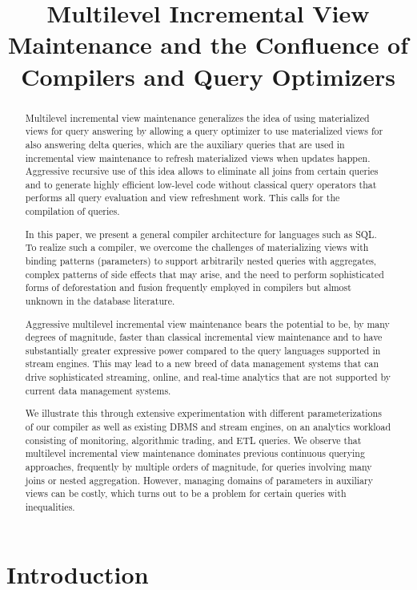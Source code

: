 \documentclass{sig-alternate}
\title{Multilevel Incremental View Maintenance and the Confluence of
Compilers and Query Optimizers}
\author{
}
\begin{document}
\maketitle


\begin{abstract}
Multilevel incremental view maintenance generalizes the idea of using materialized views for query answering by allowing a query optimizer to use materialized views for also answering delta queries, which are the auxiliary queries that are used in incremental view maintenance to refresh materialized views when updates happen. Aggressive recursive use of this idea allows to eliminate all joins from certain queries and to generate highly efficient low-level code without classical query operators that performs all query evaluation and view refreshment work. This calls for the compilation of queries.

In this paper, we present a general compiler architecture for languages such as SQL. To realize such a compiler, we overcome the challenges of materializing views with binding patterns (parameters) to support arbitrarily nested queries with aggregates, complex patterns of side effects that may arise, and the need to perform sophisticated forms of deforestation and fusion frequently employed in compilers but almost unknown in the database literature.

Aggressive multilevel incremental view maintenance bears the potential to be, by many degrees of magnitude, faster than classical incremental view maintenance and to have substantially greater expressive power compared to the query languages supported in stream engines. This may lead to a new breed of data management systems that can drive sophisticated streaming, online, and real-time analytics that are not supported by current data management systems.

We illustrate this through extensive experimentation with different parameterizations of our compiler as well as existing DBMS and stream engines, on an analytics workload consisting of monitoring, algorithmic trading, and ETL queries. We observe that multilevel incremental view maintenance dominates previous continuous querying approaches, frequently by multiple orders of magnitude, for queries involving many joins or nested aggregation. However, managing domains of parameters in auxiliary views can be costly, which turns out to be a problem for certain queries with inequalities.
\end{abstract}


\section{Introduction}
\label{sec:introduction}

\end{document}
